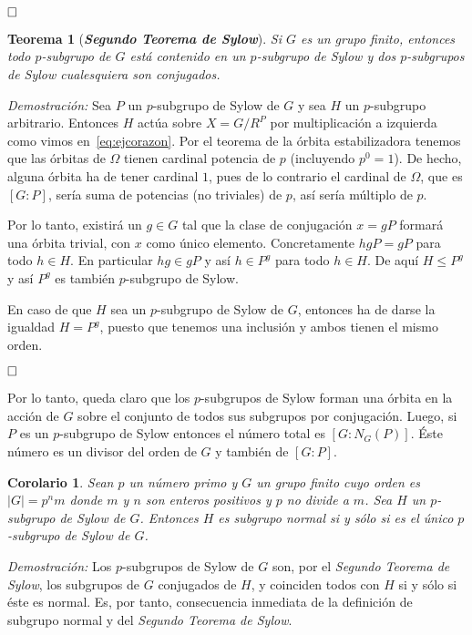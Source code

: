 \documentclass[12pt]{article}
\newtheorem{theorem}{Teorema}[section]
\newtheorem{corolario}{Corolario}[theorem]
\begin{document}
$\hfill \square$

\begin{theorem}[\textbf{\textit{Segundo Teorema de Sylow}}]Si $G$ es un grupo finito, entonces todo $p$-subgrupo de $G$ está contenido en un $p$-subgrupo de Sylow y dos $p$-subgrupos de Sylow cualesquiera son conjugados.

\end{theorem}
\emph{Demostración: }Sea $P$ un $p$-subgrupo de Sylow de $G$ y sea $H$ un $p$-subgrupo arbitrario. Entonces $H$ actúa sobre $X= G/R^{P}$ por multiplicación a izquierda como vimos en~\ref{eq:ejcorazon}. Por el teorema de la órbita estabilizadora tenemos que las órbitas de $\Omega$ tienen cardinal potencia de $p$ (incluyendo $p^{0}=1$). De hecho, alguna órbita ha de tener cardinal $1$, pues de lo contrario el cardinal de $\Omega$, que es $[G:P]$, sería suma de potencias (no triviales) de $p$, así sería múltiplo de $p$.

Por lo tanto, existirá un $g \in G$ tal que la clase de conjugación $x = gP$ formará una órbita trivial, con $x$ como único elemento. Concretamente $hgP = gP$ para todo $h \in H$. En particular $hg \in gP$ y así $h \in P^{g}$ para todo $h \in H$. De aquí $H \leq P^{g}$ y así $P^{g}$ es también $p$-subgrupo de Sylow.

En caso de que $H$ sea un $p$-subgrupo de Sylow de $G$, entonces ha de darse la igualdad $H = P^{g}$, puesto que tenemos una inclusión y ambos tienen el mismo orden.

$\hfill \square$

Por lo tanto, queda claro que los $p$-subgrupos de Sylow forman una órbita en la acción de $G$ sobre el conjunto de todos sus subgrupos por conjugación. Luego, si $P$ es un $p$-subgrupo de Sylow entonces el número total es $[G: N_{G}(P)]$. Éste número es un divisor del orden de $G$ y también de $[G:P]$.

\begin{corolario}Sean $p$ un número primo y $G$ un grupo finito cuyo orden es $|G| = p^{n}m$ donde $m$ y $n$ son enteros positivos y $p$ no divide a $m$. Sea $H$ un $p$-subgrupo de Sylow de $G$. Entonces $H$ es subgrupo normal si y sólo si es el único $p$-subgrupo de Sylow de $G$.
\end{corolario}
\emph{Demostración: }Los $p$-subgrupos de Sylow de $G$ son, por el \textit{Segundo Teorema de Sylow}, los subgrupos de $G$ conjugados de $H$, y coinciden todos con $H$ si y sólo si éste es normal. Es, por tanto, consecuencia inmediata de la definición de subgrupo normal y del \textit{Segundo Teorema de Sylow}.
\end{document}
